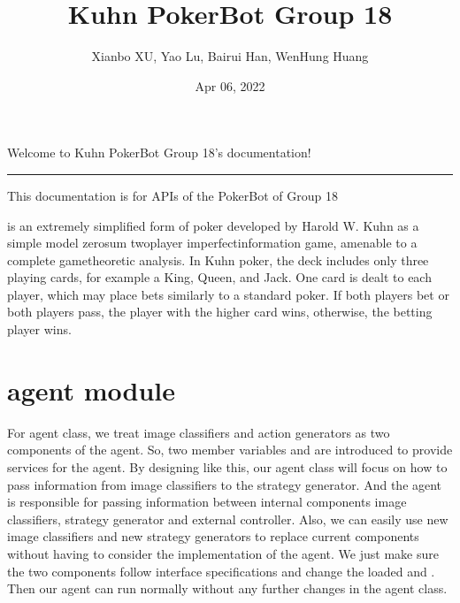 \documentclass[letterpaper,10pt,english]{sphinxmanual}
\title{Kuhn PokerBot Group 18}
\date{Apr 06, 2022}
\author{Xianbo XU, Yao Lu, Bairui Han, Wen\sphinxhyphen{}Hung Huang}
\begin{document}
\pagestyle{empty}
\sphinxmaketitle
\pagestyle{plain}
\sphinxtableofcontents
\pagestyle{normal}
\label{\detokenize{index::doc}}
\sphinxAtStartPar
Welcome to Kuhn PokerBot Group 18’s documentation!


\bigskip\hrule\bigskip


\sphinxAtStartPar
This documentation is for APIs of the PokerBot of Group 18

\sphinxstepscope



\sphinxAtStartPar
{} is an extremely simplified form of poker developed by Harold W. Kuhn as a simple model zero\sphinxhyphen{}sum two\sphinxhyphen{}player imperfect\sphinxhyphen{}information game, amenable to a complete game\sphinxhyphen{}theoretic analysis. In Kuhn poker, the deck includes only three playing cards, for example a King, Queen, and Jack. One card is dealt to each player, which may place bets similarly to a standard poker.
If both players bet or both players pass, the player with the higher card wins, otherwise, the betting player wins. 

\sphinxstepscope


\chapter{agent module}
\label{\detokenize{agent:agent-module}}\label{\detokenize{agent::doc}}
\sphinxAtStartPar
For agent class, we treat image classifiers and action generators as two components of the agent. So, two member variables  and  are introduced to provide services for the agent.
By designing like this, our agent class will focus on how to pass information from image classifiers to the strategy generator. And the agent is responsible for passing information between internal components image classifiers, strategy generator and external controller.
Also, we can easily use new image classifiers and new strategy generators to replace current components without having to consider the implementation of the agent. We just make sure the two components follow interface specifications and change the loaded  and .
Then our agent can run normally without any further changes in the agent class.

\label{\detokenize{agent:module-agent}}
\end{document}
